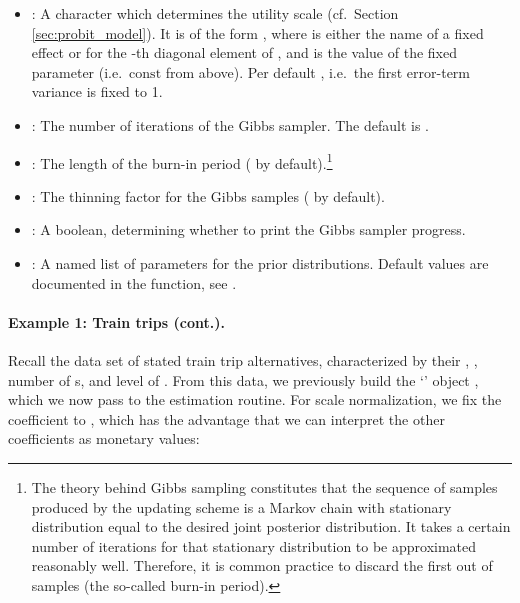 \documentclass[article,shortnames]{jss}
\newcommand{\class}[1]{`\code{#1}'}
\newcommand{\fct}[1]{\code{#1()}}
\begin{document}
\begin{itemize}
  \item {}: A character which determines the utility scale (cf.\ Section \ref{sec:probit_model}). It is of the form , where  is either the name of a fixed effect or  for the -th diagonal element of , and  is the value of the fixed parameter (i.e.\ $\text{const}$ from above). Per default , i.e.\ the first error-term variance is fixed to 1.
  \item {}: The number of iterations of the Gibbs sampler. The default is .
  \item {}: The length of the burn-in period ( by default).\footnote{The theory behind Gibbs sampling constitutes that the sequence of samples produced by the
updating scheme is a Markov chain with stationary distribution equal to the desired joint posterior distribution. It takes a certain number of iterations for that stationary distribution to be approximated reasonably well. Therefore, it is common practice to discard the first  out of  samples (the so-called burn-in period).}
  \item {}: The thinning factor for the Gibbs samples ( by default).
  \item {}: A boolean, determining whether to print the Gibbs sampler progress.
  \item {}: A named list of parameters for the prior distributions. Default values are documented in the \fct{check\_prior} function, see .
\end{itemize}

\paragraph{Example 1: Train trips (cont.).}

Recall the  data set of stated train trip alternatives, characterized by their , , number of s, and level of . From this data, we previously build the \class{RprobitB\_data} object , which we now pass to the estimation routine. For scale normalization, we fix the  coefficient to , which has the advantage that we can interpret the other coefficients as monetary values:
\end{document}
